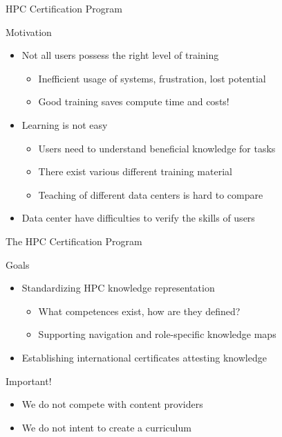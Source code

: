 \documentclass[compress,aspectratio=169]{beamer}
\begin{document}
\begin{frame}{HPC Certification Program}
	\begin{block}{Motivation}
		\begin{itemize}

			\item Not all users possess the right level of training
				\begin{itemize}
				\item Inefficient usage of systems, frustration, lost potential
				\item Good training saves compute time and costs!
				\end{itemize}
			\item Learning is not easy
			\begin{itemize}
				\item Users need to understand beneficial knowledge for tasks
				\item There exist various different training material
				\item Teaching of different data centers is hard to compare
			\end{itemize}
			\item Data center have difficulties to verify the skills of users
		\end{itemize}
	\end{block}

\end{frame}



\begin{frame}{The HPC Certification Program}
		\begin{block}{Goals}
			\begin{itemize}
				\item Standardizing HPC knowledge representation
          \begin{itemize}
						\item What competences exist, how are they defined?
            \item Supporting navigation and role-specific knowledge maps
          \end{itemize}
				\item Establishing international certificates attesting knowledge
			\end{itemize}
		\end{block}

		\begin{block}{Important!}
			\begin{itemize}
				\item We do not compete with content providers
				\item We do not intent to create a curriculum
			\end{itemize}
		\end{block}
\end{frame}
\end{document}
